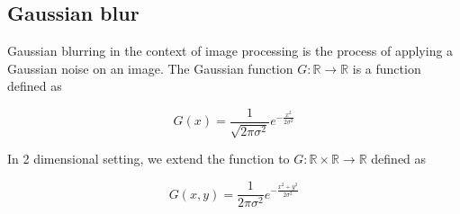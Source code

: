 \documentclass[pdftex,12pt,a4paper]{report}
\begin{document}


\subsection{Gaussian blur}
\label{subsection:gaussian_blur}

Gaussian blurring in the context of image processing is the process of applying a Gaussian noise on an image. The Gaussian function $G: \mathbb{R} \rightarrow \mathbb{R}$ is a function defined as

$$
G(x) = \frac{1}{\sqrt{2\pi \sigma^2}} e^{-\frac{x^2}{2 \sigma^2}}
$$

In 2 dimensional setting, we extend the function to $G: \mathbb{R} \times \mathbb{R} \rightarrow \mathbb{R}$ defined as

\begin{equation}
G(x,y) = \frac{1}{{2\pi \sigma^2}} e^{-\frac{x^2 + y^2}{2 \sigma^2}}
\label{equation:gauss_2d}
\end{equation}
\end{document}
